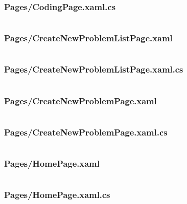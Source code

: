 \documentclass[a4paper]{report}
\begin{document}
\inputminted{xml}{"../src/Algorithm Dynamics/Pages/CodingPage.xaml"}

\subsubsection{Pages/CodingPage.xaml.cs}

\inputminted{csharp}{"../src/Algorithm Dynamics/Pages/CodingPage.xaml.cs"}

\subsubsection{Pages/CreateNewProblemListPage.xaml}

\inputminted{xml}{"../src/Algorithm Dynamics/Pages/CreateNewProblemListPage.xaml"}

\subsubsection{Pages/CreateNewProblemListPage.xaml.cs}

\inputminted{csharp}{"../src/Algorithm Dynamics/Pages/CreateNewProblemListPage.xaml.cs"}

\subsubsection{Pages/CreateNewProblemPage.xaml}

\inputminted{xml}{"../src/Algorithm Dynamics/Pages/CreateNewProblemPage.xaml"}

\subsubsection{Pages/CreateNewProblemPage.xaml.cs}

\inputminted{csharp}{"../src/Algorithm Dynamics/Pages/CreateNewProblemPage.xaml.cs"}

\subsubsection{Pages/HomePage.xaml}

\inputminted{xml}{"../src/Algorithm Dynamics/Pages/HomePage.xaml"}

\subsubsection{Pages/HomePage.xaml.cs}

\inputminted{csharp}{"../src/Algorithm Dynamics/Pages/HomePage.xaml.cs"}
\end{document}
